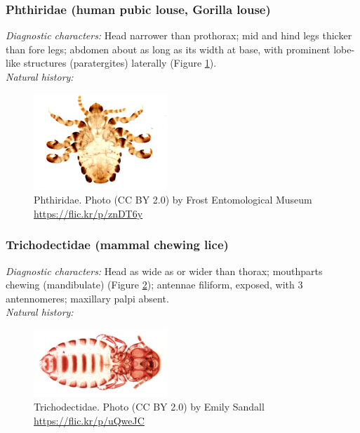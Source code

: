 \documentclass[letterpaper, 11pt]{article}
\begin{document}
\subsubsection{Phthiridae (human pubic louse, Gorilla louse)}
\noindent{}\textit{Diagnostic characters:} Head narrower than prothorax; mid and hind legs thicker than fore legs; abdomen about as long as its width at base, with prominent lobe-like structures (paratergites) laterally (Figure \ref{fig:phthirid}).\\

\noindent{}\textit{Natural history:} \\

\begin{figure}[ht!]
 \centering
 \includegraphics[width=0.45\textwidth]{PhthiridHabitus}
 \caption{Phthiridae. Photo (CC BY 2.0) by Frost Entomological Museum \url{https://flic.kr/p/znDT6y}}
 \label{fig:phthirid}
\end{figure}

\subsubsection{Trichodectidae (mammal chewing lice)}
\noindent{}\textit{Diagnostic characters:} Head as wide as or wider than thorax; mouthparts chewing (mandibulate) (Figure \ref{fig:trichodectid}); antennae filiform, exposed, with 3 antennomeres; maxillary palpi absent. \\

\noindent{}\textit{Natural history:} \\

\begin{figure}[ht!]
 \centering
 \includegraphics[width=0.45\textwidth]{TrichodectidHabitus}
 \caption{Trichodectidae. Photo (CC BY 2.0) by Emily Sandall \url{https://flic.kr/p/uQweJC}}
 \label{fig:trichodectid}
\end{figure}
\end{document}
